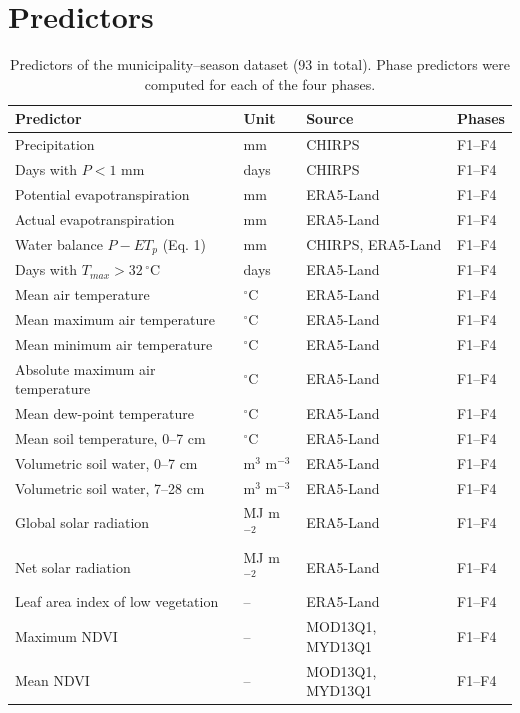 
\section{Predictors}

\begin{table}[H]
\centering
\caption{Predictors of the municipality--season dataset (93 in total). Phase predictors were computed for each of the four phases.}\label{tab:S_pred}
\small
\begin{tabular}{@{}llll@{}}
\toprule
Predictor & Unit & Source & Phases \\
\midrule
Precipitation & mm & CHIRPS & F1--F4 \\
Days with $P < 1$ mm & days & CHIRPS & F1--F4 \\
Potential evapotranspiration & mm & ERA5-Land & F1--F4 \\
Actual evapotranspiration & mm & ERA5-Land & F1--F4 \\
Water balance $P - ET_p$ (Eq. 1) & mm & CHIRPS, ERA5-Land & F1--F4 \\
Days with $T_{max} > 32\,^\circ$C & days & ERA5-Land & F1--F4 \\
Mean air temperature & $^\circ$C & ERA5-Land & F1--F4 \\
Mean maximum air temperature & $^\circ$C & ERA5-Land & F1--F4 \\
Mean minimum air temperature & $^\circ$C & ERA5-Land & F1--F4 \\
Absolute maximum air temperature & $^\circ$C & ERA5-Land & F1--F4 \\
Mean dew-point temperature & $^\circ$C & ERA5-Land & F1--F4 \\
Mean soil temperature, 0--7 cm & $^\circ$C & ERA5-Land & F1--F4 \\
Volumetric soil water, 0--7 cm & m$^3$ m$^{-3}$ & ERA5-Land & F1--F4 \\
Volumetric soil water, 7--28 cm & m$^3$ m$^{-3}$ & ERA5-Land & F1--F4 \\
Global solar radiation & MJ m$^{-2}$ & ERA5-Land & F1--F4 \\
Net solar radiation & MJ m$^{-2}$ & ERA5-Land & F1--F4 \\
Leaf area index of low vegetation & -- & ERA5-Land & F1--F4 \\
Maximum NDVI & -- & MOD13Q1, MYD13Q1 & F1--F4 \\
Mean NDVI & -- & MOD13Q1, MYD13Q1 & F1--F4 \\

\end{tabular}
\end{table}
